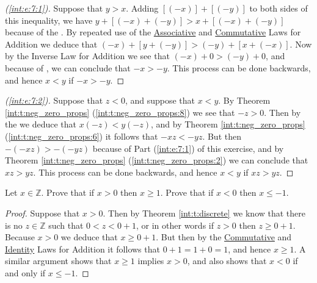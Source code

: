 \begin{proof}[(\ref{int:e:7:1})]
	Suppose that $y > x$. Adding $[(-x)] + [(-y)]$ to both sides of this inequality, we have $y + [(-x) + (-y)] > x + [(-x) + (-y)]$ because of the . By repeated use of the \hyperref[int:t:props:associative_add]{Associative} and \hyperref[int:t:props:commutative_add]{Commutative} Laws for Addition we deduce that ${(-x) + [y + (-y)] > (-y) + [x + (-x)]}$. Now by the Inverse Law for Addition we see that $(-x) + 0 > (-y) + 0$, and because of , we  can conclude that $-x > -y$. This process can be done backwards, and hence $x < y$ if $-x > -y$.
\end{proof}

\begin{proof}[(\ref{int:e:7:2})]
	Suppose that $z < 0$, and suppose that $x < y$. By Theorem \ref{int:t:neg_zero_props} (\ref{int:t:neg_zero_props:8}) we see that $-z > 0$. Then by the  we deduce that $x(-z) < y(-z)$, and by Theorem \ref{int:t:neg_zero_props} (\ref{int:t:neg_zero_props:6}) it follows that $-xz < -yz$. But then $-(-xz) > -(-yz)$ because of Part (\ref{int:e:7:1}) of this exercise, and by Theorem \ref{int:t:neg_zero_props} (\ref{int:t:neg_zero_props:2}) we can conclude that $xz > yz$. This process can be done backwards, and hence $x < y$ if $xz > yz$.
\end{proof}


\Newpage
\begin{exercise} %
	\label{int:e:8}
	Let $x \in \mathbb{Z}$. Prove that if $x > 0$ then $x \geq 1$. Prove that if $x < 0$ then $x \leq -1$.
\end{exercise}

\begin{proof}
	Suppose that $x > 0$. Then by Theorem \ref{int:t:discrete} we know that there is no $z \in \mathbb{Z}$ such that $0 < z < 0 + 1$, or in other words if $z > 0$ then $z \geq 0 + 1$. Because $x > 0$ we deduce that $x \geq 0 + 1$. But then by the \hyperref[int:t:props:commutative_add]{Commutative} and \hyperref[int:t:props:identity_add]{Identity} Laws for Addition it follows that $0 + 1 = 1 + 0 = 1$, and hence $x \geq 1$. A similar argument shows that $x \geq 1$ implies $x > 0$, and also shows that $x < 0$ if and only if $x \leq -1$.
\end{proof}


